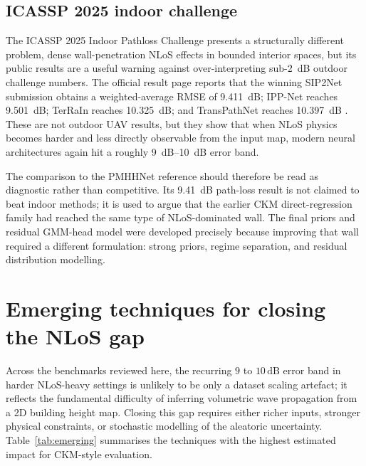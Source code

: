 \subsection{ICASSP 2025 indoor challenge}

The ICASSP 2025 Indoor Pathloss Challenge \cite{icassp2025indoor} presents a
structurally different problem, dense wall-penetration NLoS effects in bounded
interior spaces, but its public results are a useful warning against
over-interpreting sub-\SI{2}{dB} outdoor challenge numbers.  The official result
page reports that the winning SIP2Net submission obtains a weighted-average RMSE
of \SI{9.411}{dB}; IPP-Net reaches \SI{9.501}{dB}; TerRaIn reaches
\SI{10.325}{dB}; and TransPathNet reaches \SI{10.397}{dB}
\cite{indoor2025results,sip2net2025,ippnet2025,transPathNet2025}.  These are
not outdoor UAV results, but they show that when NLoS physics becomes harder
and less directly observable from the input map, modern neural architectures
again hit a roughly \SIrange{9}{10}{dB} error band.

The comparison to the PMHHNet reference should therefore be read as diagnostic rather than
competitive. Its \SI{9.41}{dB} path-loss result is not claimed to beat
indoor methods; it is used to argue that the earlier CKM direct-regression
family had reached the same type of NLoS-dominated wall. The final priors and residual GMM-head model were
developed precisely because improving that wall required a different
formulation: strong priors, regime separation, and residual distribution
modelling.

\section{Emerging techniques for closing the NLoS gap}
\label{sec:soa_emerging}

Across the benchmarks reviewed here, the recurring $9$ to $10\,\mathrm{dB}$
error band in harder NLoS-heavy settings is unlikely to be only a dataset
scaling artefact; it reflects the fundamental difficulty of inferring volumetric
wave propagation from a 2D building height map.  Closing this gap requires
either richer inputs, stronger physical constraints, or stochastic modelling of
the aleatoric uncertainty.  Table~\ref{tab:emerging} summarises the techniques
with the highest estimated impact for CKM-style evaluation.

